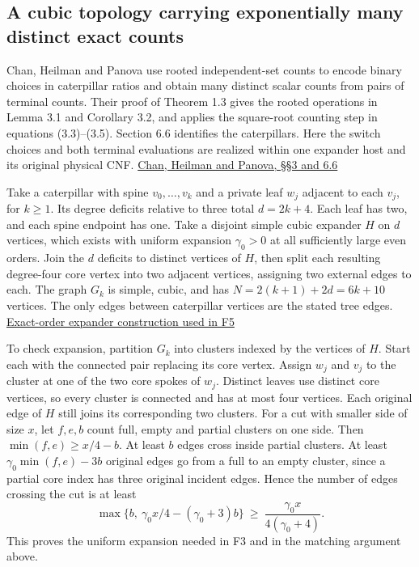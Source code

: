 \documentclass[
  11pt,
]{article}
\begin{document}
\subsection{A cubic topology carrying exponentially many distinct exact
counts}\label{v8-a-cubic-topology-carrying-exponentially-many-distinct-exact-counts}

Chan, Heilman and Panova use rooted independent-set counts to encode
binary choices in caterpillar ratios and obtain many distinct scalar
counts from pairs of terminal counts. Their proof of Theorem 1.3 gives
the rooted operations in Lemma 3.1 and Corollary 3.2, and applies the
square-root counting step in equations (3.3)--(3.5). Section 6.6
identifies the caterpillars. Here the switch choices and both terminal
evaluations are realized within one expander host and its original
physical CNF. \href{https://arxiv.org/html/2604.19094}{Chan, Heilman and
Panova, §§3 and 6.6}

Take a caterpillar with spine \(v_0,\ldots,v_k\) and a private leaf
\(w_j\) adjacent to each \(v_j\), for \(k\ge1\). Its degree deficits
relative to three total \(d=2k+4\). Each leaf has two, and each spine
endpoint has one. Take a disjoint simple cubic expander \(H\) on \(d\)
vertices, which exists with uniform expansion \(\gamma_0>0\) at all
sufficiently large even orders. Join the \(d\) deficits to distinct
vertices of \(H\), then split each resulting degree-four core vertex
into two adjacent vertices, assigning two external edges to each. The
graph \(G_k\) is simple, cubic, and has \(N=2(k+1)+2d=6k+10\) vertices.
The only edges between caterpillar vertices are the stated tree edges.
\hyperref[v8-section-stronger-family]{Exact-order expander construction
used in F5}

To check expansion, partition \(G_k\) into clusters indexed by the
vertices of \(H\). Start each with the connected pair replacing its core
vertex. Assign \(w_j\) and \(v_j\) to the cluster at one of the two core
spokes of \(w_j\). Distinct leaves use distinct core vertices, so every
cluster is connected and has at most four vertices. Each original edge
of \(H\) still joins its corresponding two clusters. For a cut with
smaller side of size \(x\), let \(f,e,b\) count full, empty and partial
clusters on one side. Then \(\min(f,e)\ge x/4-b\). At least \(b\) edges
cross inside partial clusters. At least \(\gamma_0\min(f,e)-3b\)
original edges go from a full to an empty cluster, since a partial core
index has three original incident edges. Hence the number of edges
crossing the cut is at least \[
       \max\{b,\ \gamma_0 x/4-(\gamma_0+3)b\}
                       \ \ge\ \frac{\gamma_0 x}{4(\gamma_0+4)} .
\] This proves the uniform expansion needed in F3 and in the matching
argument above.
\end{document}
